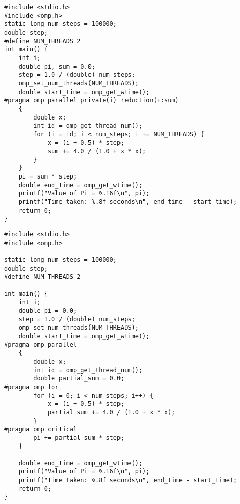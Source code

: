 \documentclass{article}
\begin{document}
\begin{lstlisting}[style=cstyle,caption={并行$\pi$值计算1}]
#include <stdio.h>
#include <omp.h>
static long num_steps = 100000;
double step;
#define NUM_THREADS 2
int main() {
    int i;
    double pi, sum = 0.0;
    step = 1.0 / (double) num_steps;
    omp_set_num_threads(NUM_THREADS);
    double start_time = omp_get_wtime();
#pragma omp parallel private(i) reduction(+:sum)
    {
        double x;
        int id = omp_get_thread_num();
        for (i = id; i < num_steps; i += NUM_THREADS) {
            x = (i + 0.5) * step;
            sum += 4.0 / (1.0 + x * x);
        }
    }
    pi = sum * step;
    double end_time = omp_get_wtime();
    printf("Value of Pi = %.16f\n", pi);
    printf("Time taken: %.8f seconds\n", end_time - start_time);
    return 0;
} 
\end{lstlisting}
\begin{lstlisting}[style=cstyle,caption={并行$\pi$值计算2}]
#include <stdio.h>
#include <omp.h>

static long num_steps = 100000;
double step;
#define NUM_THREADS 2

int main() {
    int i;
    double pi = 0.0;
    step = 1.0 / (double) num_steps;
    omp_set_num_threads(NUM_THREADS);
    double start_time = omp_get_wtime();
#pragma omp parallel
    {
        double x;
        int id = omp_get_thread_num();
        double partial_sum = 0.0;
#pragma omp for
        for (i = 0; i < num_steps; i++) {
            x = (i + 0.5) * step;
            partial_sum += 4.0 / (1.0 + x * x);
        }
#pragma omp critical
        pi += partial_sum * step;
    }

    double end_time = omp_get_wtime();
    printf("Value of Pi = %.16f\n", pi);
    printf("Time taken: %.8f seconds\n", end_time - start_time);
    return 0;
}  
\end{lstlisting}
\end{document}
